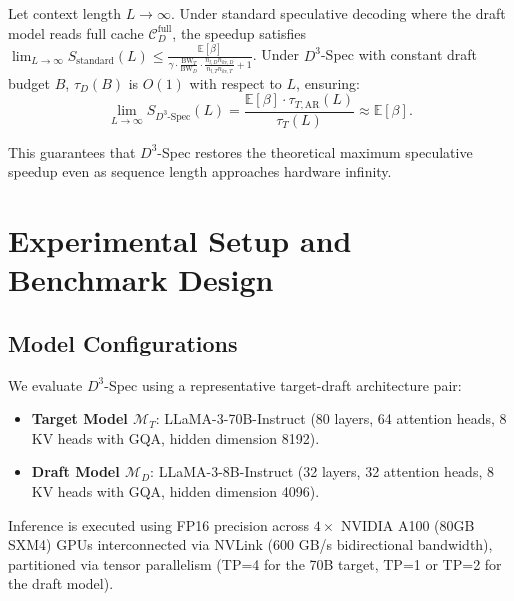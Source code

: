 \documentclass[runningheads]{llncs}
\begin{document}
\begin{theorem}
Let context length $L \to \infty$. Under standard speculative decoding where the draft model reads full cache $\mathcal{C}_D^{\text{full}}$, the speedup satisfies $\lim_{L \to \infty} S_{\text{standard}}(L) \le \frac{\mathbb{E}[\beta]}{\gamma \cdot \frac{\text{BW}_T}{\text{BW}_D} \cdot \frac{n_{l, D} n_{kv, D}}{n_{l, T} n_{kv, T}} + 1}$. Under $D^3$-Spec with constant draft budget $B$, $\tau_D(B)$ is $O(1)$ with respect to $L$, ensuring:
\begin{equation}
    \lim_{L \to \infty} S_{D^3\text{-Spec}}(L) = \frac{\mathbb{E}[\beta] \cdot \tau_{T, \text{AR}}(L)}{\tau_T(L)} \approx \mathbb{E}[\beta].
\end{equation}
\end{theorem}
This guarantees that $D^3$-Spec restores the theoretical maximum speculative speedup even as sequence length approaches hardware infinity.

\section{Experimental Setup and Benchmark Design}
\label{sec:experiments}

\subsection{Model Configurations}
We evaluate $D^3$-Spec using a representative target-draft architecture pair:
\begin{itemize}
    \item \textbf{Target Model $\mathcal{M}_T$}: LLaMA-3-70B-Instruct (80 layers, 64 attention heads, 8 KV heads with GQA, hidden dimension 8192).
    \item \textbf{Draft Model $\mathcal{M}_D$}: LLaMA-3-8B-Instruct (32 layers, 32 attention heads, 8 KV heads with GQA, hidden dimension 4096).
\end{itemize}
Inference is executed using FP16 precision across $4\times$ NVIDIA A100 (80GB SXM4) GPUs interconnected via NVLink (600 GB/s bidirectional bandwidth), partitioned via tensor parallelism (TP=4 for the 70B target, TP=1 or TP=2 for the draft model).
\end{document}
